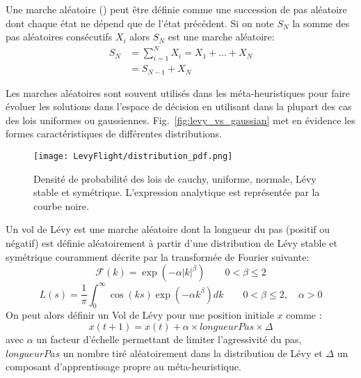 \begin{Def}\label{def:marche_aleatoire}
Une marche aléatoire (\cite{Yang201445}) peut être définie comme une succession de pas
aléatoire dont chaque état ne dépend que de l’état précédent. Si on note $S_{N}$
la somme des pas aléatoires consécutifs $X_{i}$ alors $S_{N}$ est une marche aléatoire:
\begin{equation}\label{eq:marche_aleatoire}
    \begin{split}
        S_{N} &= \sum_{i=1}^{N} X_{i} = X_{1} + ... + X_{N}\\
              &= S_{N-1} + X_{N}
    \end{split}
\end{equation}
\end{Def}

Les marches aléatoires sont souvent utilisés dans les méta-heuristiques pour faire
évoluer les solutions dans l’espace de décision en utilisant dans la plupart des cas
des lois uniformes ou gaussiennes. Fig.~\ref{fig:levy_vs_gaussian} met en évidence
les formes caractéristiques de différentes distributions.
\begin{figure}
    \begin{center}
        \texttt{[image: LevyFlight/distribution\_pdf.png]}
    \end{center}
    \caption{Densité de probabilité des lois de cauchy, uniforme, normale, Lévy stable et symétrique.
             L’expression analytique est représentée par la courbe noire.
             \label{fig:distribution_pdf}}
\end{figure}

\begin{Def}\label{def:vol_levy}
Un vol de Lévy est une marche aléatoire dont la longueur du pas (positif ou négatif)
est définie aléatoirement à partir d’une distribution de Lévy stable et symétrique
couramment décrite par la transformée de Fourier suivante:
\begin{equation}\label{eq:fourier_levy}
    \mathcal{F}(k) = \exp(-\alpha\mathopen{|}k\mathclose{|}^{\beta}) \qquad  0 < \beta \leq 2
\end{equation}
\begin{equation}\label{eq:dist_levy}
    L(s) = \frac{1}{\pi} \int_{0}^{\infty} \cos(k s)\exp(-\alpha k^{\beta}) dk \qquad  0 < \beta \leq 2, \quad \alpha > 0
\end{equation}
On peut alors définir un Vol de Lévy pour une position initiale $x$ comme :
\begin{equation}
  x(t + 1) = x(t) + \alpha \times longueurPas \times \Delta
\end{equation}
avec $\alpha$ un facteur d’échelle permettant de limiter l’agressivité du pas,
$longueurPas$ un nombre tiré aléatoirement dans la distribution de Lévy et $\Delta$
un composant d’apprentissage propre au méta-heuristique.
\end{Def}

